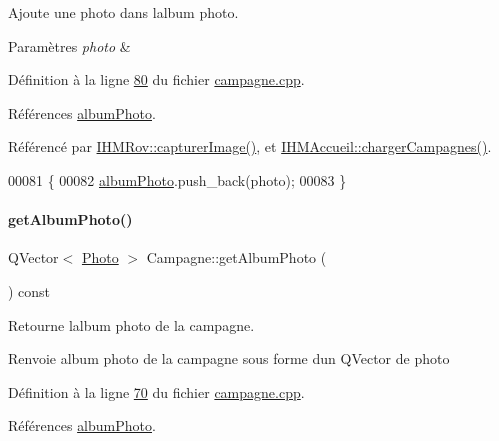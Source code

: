 Ajoute une photo dans l\textquotesingle{}album photo. 


\begin{DoxyParams}{Paramètres}
{\em photo} & \\
\hline
\end{DoxyParams}


Définition à la ligne \hyperlink{campagne_8cpp_source_l00080}{80} du fichier \hyperlink{campagne_8cpp_source}{campagne.\+cpp}.



Références \hyperlink{campagne_8h_source_l00046}{album\+Photo}.



Référencé par \hyperlink{ihmrov_8cpp_source_l00179}{I\+H\+M\+Rov\+::capturer\+Image()}, et \hyperlink{ihmaccueil_8cpp_source_l00130}{I\+H\+M\+Accueil\+::charger\+Campagnes()}.


\begin{DoxyCode}
00081 \{
00082     \hyperlink{class_campagne_a4d1fc7d4dbf10868a297fe3df7f08dbf}{albumPhoto}.push\_back(photo);
00083 \}
\end{DoxyCode}
\mbox{\label{class_campagne_abec90fcbc0c4ded45caaac9adb454add}} 
\paragraph{\texorpdfstring{get\+Album\+Photo()}{getAlbumPhoto()}}
{\footnotesize\ttfamily Q\+Vector$<$ \hyperlink{struct_photo}{Photo} $>$ Campagne\+::get\+Album\+Photo (\begin{DoxyParamCaption}{ }\end{DoxyParamCaption}) const}



Retourne l\textquotesingle{}album photo de la campagne. 

\begin{DoxyReturn}{Renvoie}
album photo de la campagne sous forme d\textquotesingle{}un Q\+Vector de photo 
\end{DoxyReturn}


Définition à la ligne \hyperlink{campagne_8cpp_source_l00070}{70} du fichier \hyperlink{campagne_8cpp_source}{campagne.\+cpp}.



Références \hyperlink{campagne_8h_source_l00046}{album\+Photo}.



